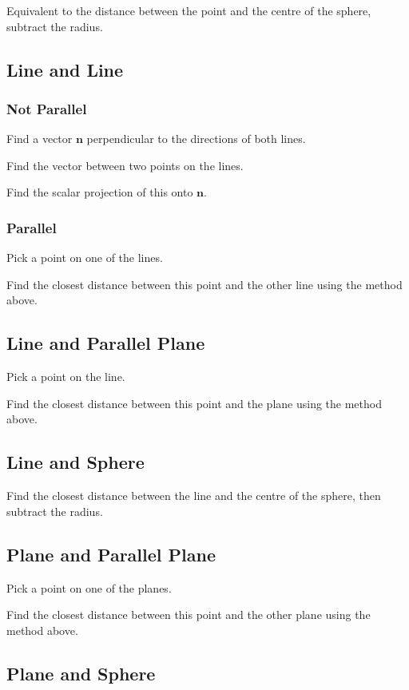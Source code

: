 \documentclass[a4paper,11pt]{article}
\newcommand{\bb}{\boldsymbol}
\begin{document}
Equivalent to the distance between the point and the centre of the sphere,
subtract the radius.


\subsection{Line and Line}

\subsubsection{Not Parallel}

Find a vector $\bb{n}$ perpendicular to the directions of both lines.

Find the vector between two points on the lines.

Find the scalar projection of this onto $\bb{n}$.


\subsubsection{Parallel}

Pick a point on one of the lines.

Find the closest distance between this point and the other line using the
method above.


\subsection{Line and Parallel Plane}

Pick a point on the line.

Find the closest distance between this point and the plane using the method
above.


\subsection{Line and Sphere}

Find the closest distance between the line and the centre of the sphere, then
subtract the radius.


\subsection{Plane and Parallel Plane}

Pick a point on one of the planes.

Find the closest distance between this point and the other plane using the
method above.


\subsection{Plane and Sphere}
\end{document}
